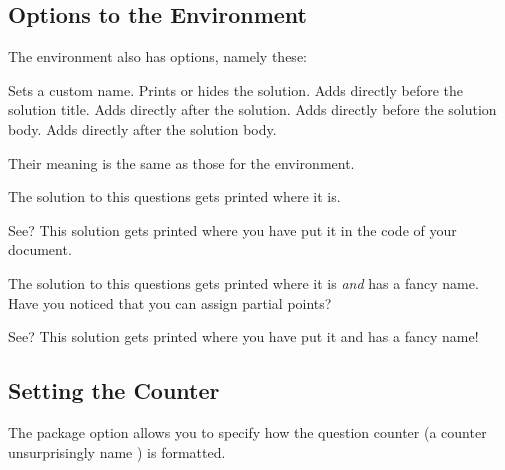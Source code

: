 \documentclass[load-preamble+,scrartcl={DIV10}]{cnltx-doc}
\begin{document}
\subsection{Options to the  Environment}\label{sec:opti-soli-envir}
The  environment also has options, namely these:
\begin{options}
  \Default
    Sets a custom name.
    Prints or hides the solution.
  \Default
    Adds  directly before the solution title.
  \Default
    Adds  directly after the solution.
  \Default
    Adds  directly before the solution body.
  \Default
    Adds  directly after the solution body.
\end{options}
Their meaning is the same as those for the  environment.
\begin{example}
  \begin{question}{5}
    The solution to this questions gets printed where it is.
  \end{question}
  \begin{solution}[print]
    See? This solution gets printed where you have put it in the code of
    your document.
  \end{solution}
  \begin{question}{2.5}
    The solution to this questions gets printed where it is \emph{and}
    has a fancy name. Have you noticed that you can assign partial
    points?
  \end{question}
  \begin{solution}[print,name=Fancy name]
    See? This solution gets printed where you have put it and has a fancy
    name!
  \end{solution}
\end{example}

\subsection{Setting the Counter}\label{ssec:counter}
The package option  allows you to specify how the question
counter (a counter unsurprisingly name ) is formatted.
\end{document}
